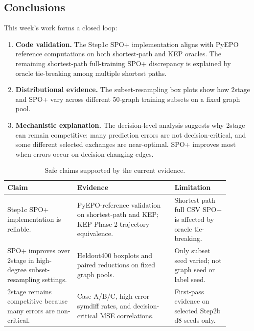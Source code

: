 \documentclass[11pt]{article}
\begin{document}
\subsection{Conclusions}
This week's work forms a closed loop:

\begin{enumerate}
    \item \textbf{Code validation.} The Step1c SPO+ implementation aligns with
    PyEPO reference computations on both shortest-path and KEP oracles. The
    remaining shortest-path full-training SPO+ discrepancy is explained by
    oracle tie-breaking among multiple shortest paths.
    
    \item \textbf{Distributional evidence.} The subset-resampling box plots show
    how 2stage and SPO+ vary across different 50-graph training subsets on a
    fixed graph pool.
    
    \item \textbf{Mechanistic explanation.} The decision-level analysis suggests
    why 2stage can remain competitive: many prediction errors are not
    decision-critical, and some different selected exchanges are near-optimal.
    SPO+ improves most when errors occur on decision-changing edges.
\end{enumerate}

\begin{table}[h]
\centering
\small
\caption{Safe claims supported by the current evidence.}
\label{tab:safe-claims}
\begin{tabular}{p{0.29\linewidth}p{0.39\linewidth}p{0.22\linewidth}}
\toprule
Claim & Evidence & Limitation \\
\midrule
Step1c SPO+ implementation is reliable.
& PyEPO-reference validation on shortest-path and KEP; KEP Phase 2 trajectory equivalence.
& Shortest-path full CSV SPO+ is affected by oracle tie-breaking. \\
\midrule
SPO+ improves over 2stage in high-degree subset-resampling settings.
& Heldout400 boxplots and paired reductions on fixed graph pools.
& Only subset seed varied; not graph seed or label seed. \\
\midrule
2stage remains competitive because many errors are non-critical.
& Case A/B/C, high-error symdiff rates, and decision-critical MSE correlations.
& First-pass evidence on selected Step2b d8 seeds only. \\
\bottomrule
\end{tabular}
\end{table}
\end{document}

